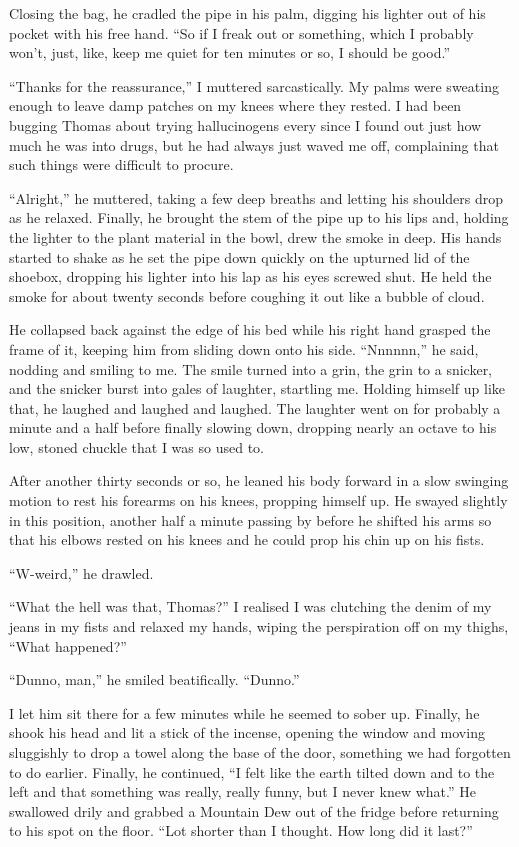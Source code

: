 Closing the bag, he cradled the pipe in his palm, digging his lighter out of his pocket with his free hand.  ``So if I freak out or something, which I probably won't, just, like, keep me quiet for ten minutes or so, I should be good.''

``Thanks for the reassurance,'' I muttered sarcastically.  My palms were sweating enough to leave damp patches on my knees where they rested.  I had been bugging Thomas about trying hallucinogens every since I found out just how much he was into drugs, but he had always just waved me off, complaining that such things were difficult to procure.

``Alright,'' he muttered, taking a few deep breaths and letting his shoulders drop as he relaxed.  Finally, he brought the stem of the pipe up to his lips and, holding the lighter to the plant material in the bowl, drew the smoke in deep.  His hands started to shake as he set the pipe down quickly on the upturned lid of the shoebox, dropping his lighter into his lap as his eyes screwed shut.  He held the smoke for about twenty seconds before coughing it out like a bubble of cloud.

He collapsed back against the edge of his bed while his right hand grasped the frame of it, keeping him from sliding down onto his side.  ``Nnnnnn,'' he said, nodding and smiling to me.  The smile turned into a grin, the grin to a snicker, and the snicker burst into gales of laughter, startling me.  Holding himself up like that, he laughed and laughed and laughed.  The laughter went on for probably a minute and a half before finally slowing down, dropping nearly an octave to his low, stoned chuckle that I was so used to.

After another thirty seconds or so, he leaned his body forward in a slow swinging motion to rest his forearms on his knees, propping himself up.  He swayed slightly in this position, another half a minute passing by before he shifted his arms so that his elbows rested on his knees and he could prop his chin up on his fists.  

``W-weird,'' he drawled.

``What the hell was that, Thomas?''  I realised I was clutching the denim of my jeans in my fists and relaxed my hands, wiping the perspiration off on my thighs, ``What happened?''

``Dunno, man,'' he smiled beatifically.  ``Dunno.''

I let him sit there for a few minutes while he seemed to sober up.  Finally, he shook his head and lit a stick of the incense, opening the window and moving sluggishly to drop a towel along the base of the door, something we had forgotten to do earlier.  Finally, he continued, ``I felt like the earth tilted down and to the left and that something was really, really funny, but I never knew what.''  He swallowed drily and grabbed a Mountain Dew out of the fridge before returning to his spot on the floor.  ``Lot shorter than I thought.  How long did it last?''

